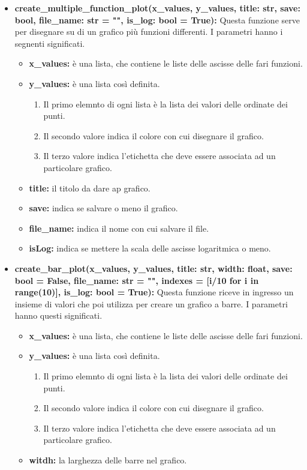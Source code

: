 \documentclass{article}
\newcommand{\newlineitem}[1]{\item \textbf{#1} \hfill \break}
\begin{document}
\begin{itemize}
\newlineitem{create\_multiple\_function\_plot(x\_values, y\_values, title: str, save: bool, file\_name: str = "", is\_log: bool = True):}
Questa funzione serve per disegnare su di un grafico più funzioni differenti. I parametri hanno i segnenti significati.
\begin{itemize}
\item \textbf{x\_values:} è una lista, che contiene le liste delle ascisse delle fari funzioni.
\item \textbf{y\_values:} è una lista così definita.
\begin{enumerate}
\item Il primo elemnto di ogni lista è la lista dei valori delle ordinate dei punti.
\item Il secondo valore indica il colore con cui disegnare il grafico.
\item Il terzo valore indica l'etichetta che deve essere associata ad un particolare grafico.
\end{enumerate}
\item \textbf{title:} il titolo da dare ap grafico.
\item \textbf{save:} indica se salvare o meno il grafico.
\item \textbf{file\_name:} indica il nome con cui salvare il file.
\item \textbf{isLog:} indica se mettere la scala delle ascisse logaritmica o meno.
\end{itemize}
\newlineitem{create\_bar\_plot(x\_values, y\_values, title: str, width: float, save: bool = False, file\_name: str = "", indexes = [i/10 for i in range(10)], is\_log: bool = True):}
Questa funzione riceve in ingresso un insieme di valori che poi utilizza per creare un grafico a barre. I parametri hanno questi significati.
\begin{itemize}
\item \textbf{x\_values:} è una lista, che contiene le liste delle ascisse delle fari funzioni.
\item \textbf{y\_values:} è una lista così definita.
\begin{enumerate}
\item Il primo elemnto di ogni lista è la lista dei valori delle ordinate dei punti.
\item Il secondo valore indica il colore con cui disegnare il grafico.
\item Il terzo valore indica l'etichetta che deve essere associata ad un particolare grafico.
\end{enumerate}
\item \textbf{witdh:} la larghezza delle barre nel grafico.

\end{itemize}
\end{itemize}
\end{document}
